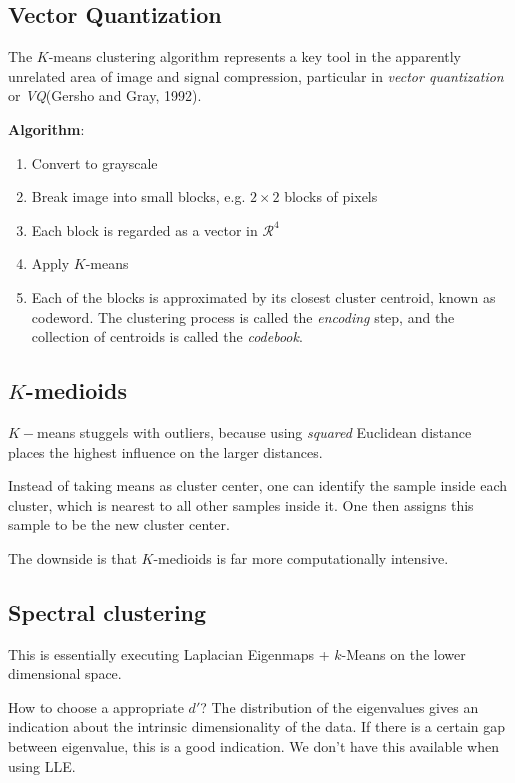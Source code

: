 \subsection*{Vector Quantization}
The \(K\)-means clustering algorithm represents a key tool in the apparently unrelated area of image and signal compression, particular in \textit{vector quantization} or \textit{VQ}(Gersho and Gray, 1992).

\textbf{Algorithm}:
\begin{enumerate}
    \item Convert to grayscale
    \item Break image into small blocks, e.g. \(2 \times 2\) blocks of pixels
    \item Each block is regarded as a vector in \(\mathcal{R}^4\)
    \item Apply \(K\)-means
    \item Each of the blocks is approximated by its closest cluster centroid, known as codeword. The clustering process is called the \textit{encoding} step, and the collection of centroids is called the \textit{codebook}.
\end{enumerate}

\subsection*{\(K\)-medioids}
 \(K-\)means stuggels with outliers, because using \textit{squared} Euclidean distance places the highest influence on the larger distances.

 Instead of taking means as cluster center, one can identify the sample inside each cluster, which is nearest to all other samples inside it. One then assigns this sample to be the new cluster center.

 The downside is that \(K\)-medioids is far more computationally intensive.

\subsection*{Spectral clustering}
This is essentially executing Laplacian Eigenmaps + \(k\)-Means on the lower dimensional space.

How to choose a appropriate \(d'\)? The distribution of the eigenvalues gives an indication about the intrinsic dimensionality of the data. If there is a certain gap between eigenvalue, this is a good indication. We don't have this available when using LLE.

